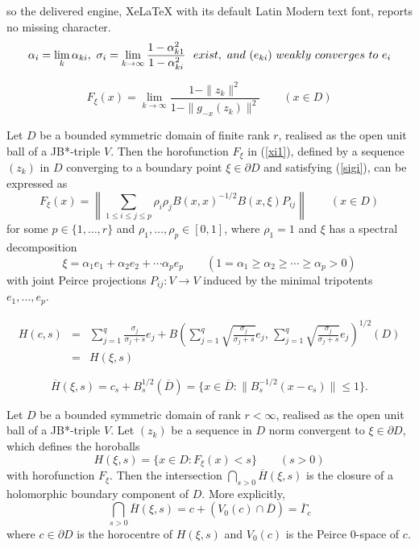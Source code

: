 \documentclass[10pt,a4paper]{amsart}
\begin{document}
so the delivered engine, XeLaTeX with its default Latin Modern text font, reports no missing character.
\begin{equation}\label{sigi}
\alpha_i = \lim_k \alpha_{ki}, ~ \sigma_i =\lim_{k\rightarrow \infty} \frac{1-\alpha_{k1}^2}{ 1-\alpha_{ki}^2}
~~{\rm exist, ~ and~}(e_{ki}) ~{\rm weakly~ converges~to~} e_i
\end{equation}

\begin{equation}\label{xi1}
 F_\xi (x) =\lim_{k\rightarrow \infty} \frac{1-\|z_k\|^2}{1-\|g_{-x}(z_k)\|^2} \qquad (x\in D)
 \end{equation}

\begin{theorem}\label{horo} Let $D$ be a bounded symmetric domain of finite rank $r$, realised as the open unit
ball of a JB*-triple $V$. Then the horofunction $F_\xi$  in (\ref{xi1}), defined by   a sequence $(z_k)$ in $D$ converging to a boundary point $\xi \in \partial D$ and satisfying (\ref{sigi}), can be expressed as
\begin{equation}\label{fxi}
F_\xi(x) =\left\|\sum_{1\leq i\leq j\leq p}\rho_i\rho_jB(x,x)^{-1/2}B(x,\xi)P_{ij}\right\|
\qquad (x\in D)
\end{equation}
for some $p\in \{1, \ldots, r\}$ and $\rho_1, \ldots, \rho_p \in [0,1]$,
where  $\rho_1=1$
and  $\xi$ has a spectral decomposition
$$\xi = \alpha_1 e_1 + \alpha_2 e_2 + \cdots \alpha_p e_p \qquad (1=\alpha_1 \geq \alpha_2 \geq \cdots \geq \alpha_p>0)
$$
with joint Peirce projections $P_{ij}: V \longrightarrow V$  induced
by the minimal tripotents $e_1, \ldots, e_{p}$.
\end{theorem}

 \begin{eqnarray}\label{e=xi}
H(c,s) &=&  \sum_{j=1}^q \frac{\sigma_j}{\sigma_j+s} e_j +
B\left (\sum_{j=1}^q \sqrt{\frac{\sigma_j}{\sigma_j+s}} e_j, \,\sum_{j=1}^q \sqrt{\frac{\sigma_j}{\sigma_j +s}} e_j
\right)^{1/2}(D)\nonumber\\
&=& H(\xi,s)
\end{eqnarray}

\begin{equation}\label{clos}
\overline H (\xi,s) = c_s + B_s^{1/2}(\overline D) = \{x\in \overline D : \|B_s^{-1/2}(x-c_s)\|\leq 1\}.
\end{equation}

\begin{theorem}\label{cr1}
Let $D$ be a bounded symmetric domain of rank $r< \infty$, realised as the open
unit ball of a JB*-triple $V$. Let $(z_k)$ be a sequence in $D$ norm convergent to $\xi\in \partial D$,
which defines the horoballs
$$H(\xi, s) = \{x\in D: F_\xi(x)<s\}  \qquad (s>0)$$
with horofunction
$F_\xi$.
Then the intersection $\bigcap_{s>0}\overline H (\xi,s)$
is the closure of a holomorphic boundary component of $D$. More explicitly,
$$\bigcap_{s>0}\overline H (\xi,s)= c + (V_0(c) \cap \overline D) = \overline \Gamma_c$$
where $c\in \partial D$ is the horocentre of $H(\xi,s)$  and $V_0(c)$ is the Peirce $0$-space of $c$.
\end{theorem}
\end{document}
